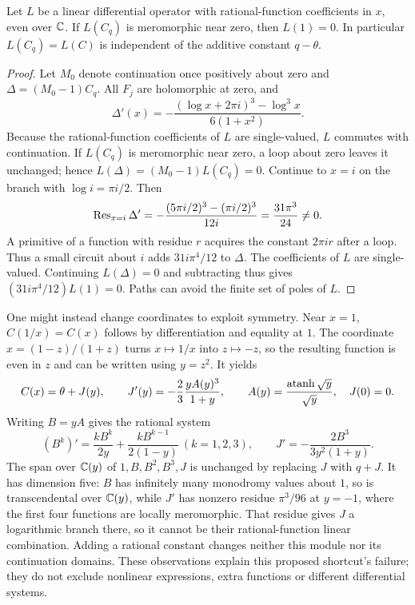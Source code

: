 \begin{proposition}\label{prop:mono}
Let $L$ be a linear differential operator with rational-function
coefficients in $x$, even over $\mathbb C$. If $L(C_q)$ is meromorphic near
zero, then $L(1)=0$. In particular $L(C_q)=L(C)$ is independent of
the additive constant $q-\theta$.
\end{proposition}
\begin{proof}
Let $M_0$ denote continuation once positively about zero and
$\Delta=(M_0-1)C_q$. All $F_j$ are holomorphic at zero, and
\[
 \Delta'(x)=-\frac{(\log x+2\pi i)^3-\log^3x}{6(1+x^2)}.
\]
Because the rational-function coefficients of $L$ are single-valued,
$L$ commutes with continuation. If $L(C_q)$ is meromorphic near
zero, a loop about zero leaves it unchanged; hence
$L(\Delta)=(M_0-1)L(C_q)=0$. Continue to $x=i$ on the
branch with $\log i=\pi i/2$. Then
\[
 \operatorname{Res}_{x=i}\Delta'
 =-\frac{(5\pi i/2)^3-(\pi i/2)^3}{12i}
 =\frac{31\pi^3}{24}\ne0.
\]
A primitive of a function with residue $r$ acquires the constant
$2\pi i r$ after a loop. Thus a small circuit about $i$ adds
$31i\pi^4/12$ to $\Delta$.
The coefficients of $L$ are single-valued. Continuing $L(\Delta)=0$
and subtracting thus gives $(31i\pi^4/12)L(1)=0$.
Paths can avoid the finite set of poles of $L$.
\end{proof}

One might instead change coordinates to exploit symmetry. Near $x=1$,
$C(1/x)=C(x)$ follows by differentiation and equality at $1$.
The coordinate $x=(1-z)/(1+z)$ turns $x\mapsto1/x$ into
$z\mapsto-z$, so the resulting function is even in $z$ and can
be written using $y=z^2$. It yields
\[
 C(x)=\theta+J(y),\qquad
 J'(y)=-\frac23\frac{yA(y)^3}{1+y},\qquad
 A(y)=\frac{\operatorname{atanh}\sqrt y}{\sqrt y},\quad J(0)=0.
\]
Writing $B=yA$ gives the rational system
\[
 (B^k)'=\frac{kB^k}{2y}+\frac{kB^{k-1}}{2(1-y)}\ (k=1,2,3),
 \qquad J'=-\frac{2B^3}{3y^2(1+y)}.
\]
The span over $\mathbb C(y)$ of $1,B,B^2,B^3,J$ is unchanged by replacing $J$ with
$q+J$. It has dimension five: $B$ has infinitely many monodromy
values about $1$, so is transcendental over $\mathbb C(y)$, while $J'$
has nonzero residue $\pi^3/96$ at $y=-1$, where the first four
functions are locally meromorphic. That residue gives $J$ a
logarithmic branch there, so it cannot be their rational-function
linear combination. Adding a rational constant changes
neither this module nor its continuation domains. These observations
explain this proposed shortcut's failure; they do not exclude
nonlinear expressions, extra functions or different differential systems.

